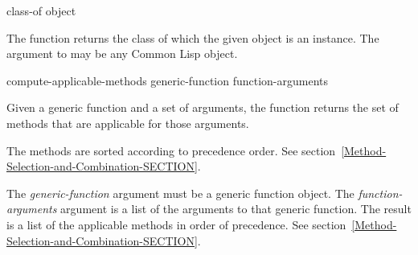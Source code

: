 \begin{defun}[Function]
class-of object

The function  returns the class of which
the given object is an instance.
The argument to  may be any Common Lisp object.
\end{defun}

\begin{defun}[Function]
compute-applicable-methods generic-function function-arguments

Given a generic function and a set of arguments, the function
 returns the set of methods
that are applicable for those arguments.

The methods are
sorted according to precedence order.
See section~\ref{Method-Selection-and-Combination-SECTION}.

The \emph{generic-function} argument must be a generic function object.
The \emph{function-arguments} argument is a list of the arguments to
that generic function.
The result is a list of the applicable methods in order of precedence.
See section~\ref{Method-Selection-and-Combination-SECTION}.
\end{defun}

